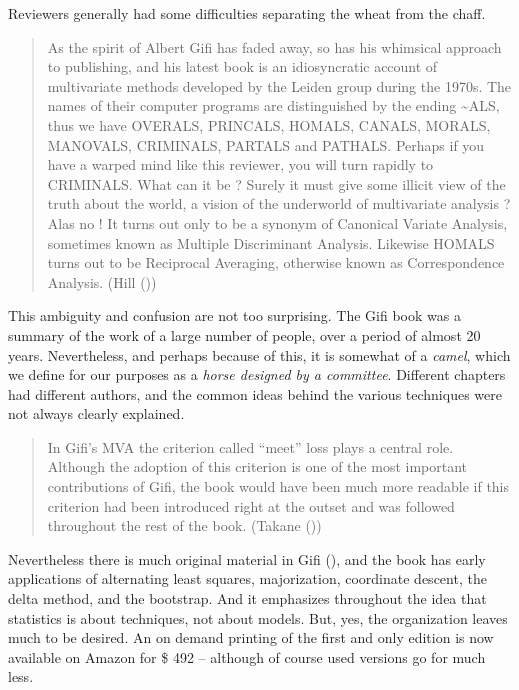\documentclass[
  12pt,
  letterpaper,
]{scrbook}
\begin{document}
Reviewers generally had some difficulties separating the wheat from the
chaff.

\begin{quote}
As the spirit of Albert Gifi has faded away, so has his whimsical
approach to publishing, and his latest book is an idiosyncratic account
of multivariate methods developed by the Leiden group during the 1970s.
The names of their computer programs are distinguished by the ending
\textasciitilde ALS, thus we have OVERALS, PRINCALS, HOMALS, CANALS,
MORALS, MANOVALS, CRIMINALS, PARTALS and PATHALS. Perhaps if you have a
warped mind like this reviewer, you will turn rapidly to CRIMINALS. What
can it be ? Surely it must give some illicit view of the truth about the
world, a vision of the underworld of multivariate analysis ? Alas no !
It turns out only to be a synonym of Canonical Variate Analysis,
sometimes known as Multiple Discriminant Analysis. Likewise HOMALS turns
out to be Reciprocal Averaging, otherwise known as Correspondence
Analysis. (Hill ())
\end{quote}

This ambiguity and confusion are not too surprising. The Gifi book was a
summary of the work of a large number of people, over a period of almost
20 years. Nevertheless, and perhaps because of this, it is somewhat of a
\emph{camel}, which we define for our purposes as a \emph{horse designed
by a committee}. Different chapters had different authors, and the
common ideas behind the various techniques were not always clearly
explained.

\begin{quote}
In Gifi's MVA the criterion called ``meet'' loss plays a central role.
Although the adoption of this criterion is one of the most important
contributions of Gifi, the book would have been much more readable if
this criterion had been introduced right at the outset and was followed
throughout the rest of the book. (Takane
())
\end{quote}

Nevertheless there is much original material in Gifi
(), and the book has early applications of
alternating least squares, majorization, coordinate descent, the delta
method, and the bootstrap. And it emphasizes throughout the idea that
statistics is about techniques, not about models. But, yes, the
organization leaves much to be desired. An on demand printing of the
first and only edition is now available on Amazon for \$ 492 -- although
of course used versions go for much less.
\end{document}
